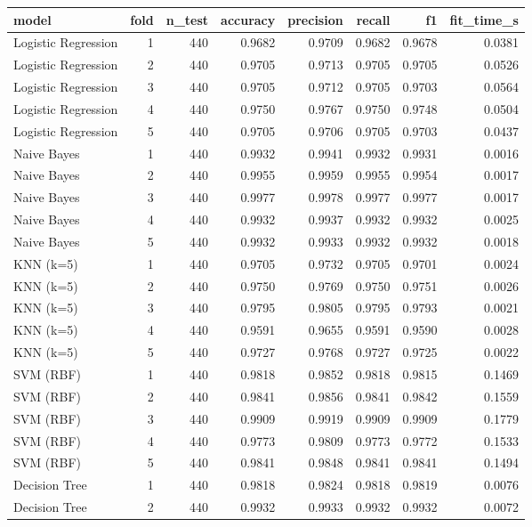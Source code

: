 \begin{tabular}{lrrrrrrr}
\toprule
model & fold & n_test & accuracy & precision & recall & f1 & fit_time_s \\
\midrule
Logistic Regression & 1 & 440 & 0.9682 & 0.9709 & 0.9682 & 0.9678 & 0.0381 \\
Logistic Regression & 2 & 440 & 0.9705 & 0.9713 & 0.9705 & 0.9705 & 0.0526 \\
Logistic Regression & 3 & 440 & 0.9705 & 0.9712 & 0.9705 & 0.9703 & 0.0564 \\
Logistic Regression & 4 & 440 & 0.9750 & 0.9767 & 0.9750 & 0.9748 & 0.0504 \\
Logistic Regression & 5 & 440 & 0.9705 & 0.9706 & 0.9705 & 0.9703 & 0.0437 \\
Naive Bayes & 1 & 440 & 0.9932 & 0.9941 & 0.9932 & 0.9931 & 0.0016 \\
Naive Bayes & 2 & 440 & 0.9955 & 0.9959 & 0.9955 & 0.9954 & 0.0017 \\
Naive Bayes & 3 & 440 & 0.9977 & 0.9978 & 0.9977 & 0.9977 & 0.0017 \\
Naive Bayes & 4 & 440 & 0.9932 & 0.9937 & 0.9932 & 0.9932 & 0.0025 \\
Naive Bayes & 5 & 440 & 0.9932 & 0.9933 & 0.9932 & 0.9932 & 0.0018 \\
KNN (k=5) & 1 & 440 & 0.9705 & 0.9732 & 0.9705 & 0.9701 & 0.0024 \\
KNN (k=5) & 2 & 440 & 0.9750 & 0.9769 & 0.9750 & 0.9751 & 0.0026 \\
KNN (k=5) & 3 & 440 & 0.9795 & 0.9805 & 0.9795 & 0.9793 & 0.0021 \\
KNN (k=5) & 4 & 440 & 0.9591 & 0.9655 & 0.9591 & 0.9590 & 0.0028 \\
KNN (k=5) & 5 & 440 & 0.9727 & 0.9768 & 0.9727 & 0.9725 & 0.0022 \\
SVM (RBF) & 1 & 440 & 0.9818 & 0.9852 & 0.9818 & 0.9815 & 0.1469 \\
SVM (RBF) & 2 & 440 & 0.9841 & 0.9856 & 0.9841 & 0.9842 & 0.1559 \\
SVM (RBF) & 3 & 440 & 0.9909 & 0.9919 & 0.9909 & 0.9909 & 0.1779 \\
SVM (RBF) & 4 & 440 & 0.9773 & 0.9809 & 0.9773 & 0.9772 & 0.1533 \\
SVM (RBF) & 5 & 440 & 0.9841 & 0.9848 & 0.9841 & 0.9841 & 0.1494 \\
Decision Tree & 1 & 440 & 0.9818 & 0.9824 & 0.9818 & 0.9819 & 0.0076 \\
Decision Tree & 2 & 440 & 0.9932 & 0.9933 & 0.9932 & 0.9932 & 0.0072 \\

\end{tabular}
